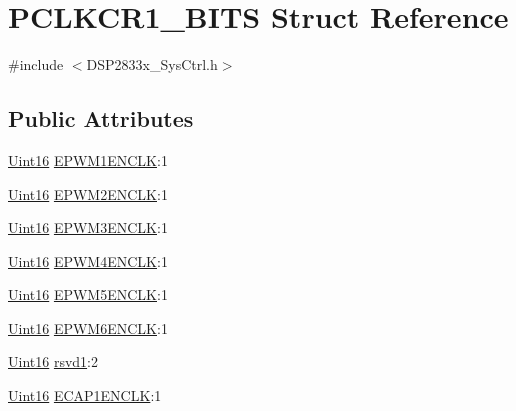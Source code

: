 \hypertarget{struct_p_c_l_k_c_r1___b_i_t_s}{}\section{P\+C\+L\+K\+C\+R1\+\_\+\+B\+I\+T\+S Struct Reference}
\label{struct_p_c_l_k_c_r1___b_i_t_s}


{\ttfamily \#include $<$D\+S\+P2833x\+\_\+\+Sys\+Ctrl.\+h$>$}

\subsection*{Public Attributes}
\begin{DoxyCompactItemize}
\item 
\hyperlink{_d_s_p2833x___device_8h_a59a9f6be4562c327cbfb4f7e8e18f08b}{Uint16} \hyperlink{struct_p_c_l_k_c_r1___b_i_t_s_aec99c0dbabd4c34e4645bb3f83b5b9dd}{E\+P\+W\+M1\+E\+N\+C\+L\+K}\+:1
\item 
\hyperlink{_d_s_p2833x___device_8h_a59a9f6be4562c327cbfb4f7e8e18f08b}{Uint16} \hyperlink{struct_p_c_l_k_c_r1___b_i_t_s_a1db64813d530c8188b4d570ebbc2327b}{E\+P\+W\+M2\+E\+N\+C\+L\+K}\+:1
\item 
\hyperlink{_d_s_p2833x___device_8h_a59a9f6be4562c327cbfb4f7e8e18f08b}{Uint16} \hyperlink{struct_p_c_l_k_c_r1___b_i_t_s_a18629aa50c49e02fc3dbe7e888deb457}{E\+P\+W\+M3\+E\+N\+C\+L\+K}\+:1
\item 
\hyperlink{_d_s_p2833x___device_8h_a59a9f6be4562c327cbfb4f7e8e18f08b}{Uint16} \hyperlink{struct_p_c_l_k_c_r1___b_i_t_s_a393e14eaac54d2218287b543fad1bf2e}{E\+P\+W\+M4\+E\+N\+C\+L\+K}\+:1
\item 
\hyperlink{_d_s_p2833x___device_8h_a59a9f6be4562c327cbfb4f7e8e18f08b}{Uint16} \hyperlink{struct_p_c_l_k_c_r1___b_i_t_s_adc84bfd7d3a98cce57fafd44a4f71f86}{E\+P\+W\+M5\+E\+N\+C\+L\+K}\+:1
\item 
\hyperlink{_d_s_p2833x___device_8h_a59a9f6be4562c327cbfb4f7e8e18f08b}{Uint16} \hyperlink{struct_p_c_l_k_c_r1___b_i_t_s_af590ef0254da581717dc1c497b74c493}{E\+P\+W\+M6\+E\+N\+C\+L\+K}\+:1
\item 
\hyperlink{_d_s_p2833x___device_8h_a59a9f6be4562c327cbfb4f7e8e18f08b}{Uint16} \hyperlink{struct_p_c_l_k_c_r1___b_i_t_s_a6783f7db0507a92abbb8a8954437acf1}{rsvd1}\+:2
\item 
\hyperlink{_d_s_p2833x___device_8h_a59a9f6be4562c327cbfb4f7e8e18f08b}{Uint16} \hyperlink{struct_p_c_l_k_c_r1___b_i_t_s_a6e74093f6bcaf284d22924f17e4c82ae}{E\+C\+A\+P1\+E\+N\+C\+L\+K}\+:1

\end{DoxyCompactItemize}
